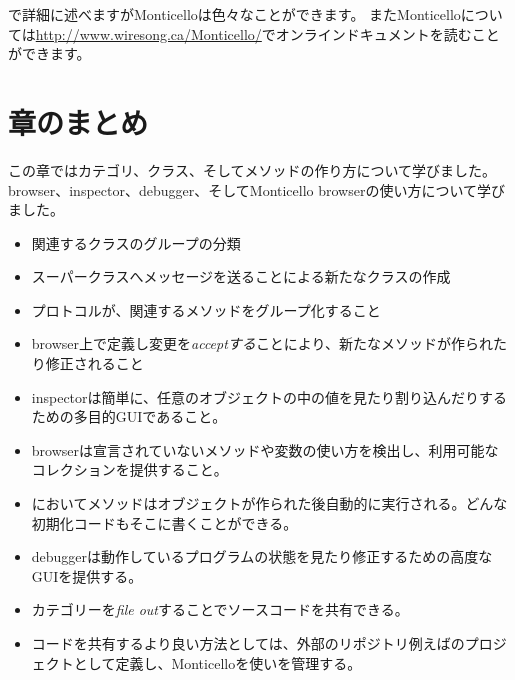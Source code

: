 \documentclass[a4paper,10pt,twoside]{book}
\begin{document}
で詳細に述べますがMonticelloは色々なことができます。
またMonticelloについては\url{http://www.wiresong.ca/Monticello/}でオンラインドキュメントを読むことができます。

\section{章のまとめ}
この章ではカテゴリ、クラス、そしてメソッドの作り方について学びました。
browser、inspector、debugger、そしてMonticello browserの使い方について学びました。

\begin{itemize}
  \item 関連するクラスのグループの分類
  \item スーパークラスへメッセージを送ることによる新たなクラスの作成
  \item プロトコルが、関連するメソッドをグループ化すること
  \item browser上で定義し変更を\emph{acceptする}ことにより、新たなメソッドが作られたり修正されること
  \item inspectorは簡単に、任意のオブジェクトの中の値を見たり割り込んだりするための多目的GUIであること。
  \item browserは宣言されていないメソッドや変数の使い方を検出し、利用可能なコレクションを提供すること。
  \item \pharo においてメソッドはオブジェクトが作られた後自動的に実行される。どんな初期化コードもそこに書くことができる。
  \item debuggerは動作しているプログラムの状態を見たり修正するための高度なGUIを提供する。
  \item カテゴリーを\emph{file out}することでソースコードを共有できる。
  \item コードを共有するより良い方法としては、外部のリポジトリ例えば\sqsrc のプロジェクトとして定義し、Monticelloを使いを管理する。
\end{itemize}

\ifx\wholebook\relax\else
\end{document}
